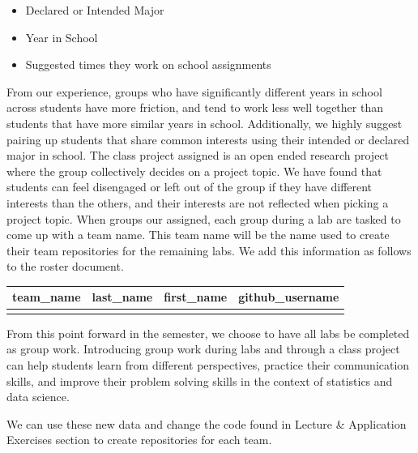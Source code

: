 \documentclass[
  12pt]{article}
\begin{document}
\begin{itemize}
\item
  Declared or Intended Major
\item
  Year in School
\item
  Suggested times they work on school assignments
\end{itemize}

From our experience, groups who have significantly different years in
school across students have more friction, and tend to work less well
together than students that have more similar years in school.
Additionally, we highly suggest pairing up students that share common
interests using their intended or declared major in school. The class
project assigned is an open ended research project where the group
collectively decides on a project topic. We have found that students can
feel disengaged or left out of the group if they have different
interests than the others, and their interests are not reflected when
picking a project topic. When groups our assigned, each group during a
lab are tasked to come up with a team name. This team name will be the
name used to create their team repositories for the remaining labs. We
add this information as follows to the roster document.

\begin{longtable}[]{@{}llll@{}}
\toprule()
team\_name & last\_name & first\_name & github\_username \\
\midrule()
\endhead
& & & \\
\bottomrule()
\end{longtable}

From this point forward in the semester, we choose to have all labs be
completed as group work. Introducing group work during labs and through
a class project can help students learn from different perspectives,
practice their communication skills, and improve their problem solving
skills in the context of statistics and data science.

We can use these new data and change the code found in Lecture \&
Application Exercises section to create repositories for each team.
\end{document}
